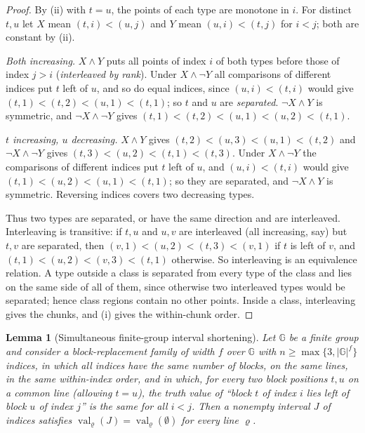 \documentclass[11pt]{article}
\numberwithin{equation}{section}
\theoremstyle{plain}
\newtheorem{lemma}[theorem]{Lemma}
\theoremstyle{definition}
\theoremstyle{remark}
\theoremstyle{plain}
\begin{document}
\begin{proof}
By (ii) with $t=u$, the points of each type are monotone in $i$.  For distinct
$t,u$ let $X$ mean $(t,i)<(u,j)$ and $Y$ mean $(u,i)<(t,j)$ for $i<j$; both are
constant by (ii).

\emph{Both increasing.}  $X\wedge Y$ puts all points of index $i$ of both types
before those of index $j>i$ (\emph{interleaved by rank}).  Under $X\wedge\neg Y$
all comparisons of different indices put $t$ left of $u$, and so do equal indices,
since $(u,i)<(t,i)$ would give $(t,1)<(t,2)<(u,1)<(t,1)$; so $t$ and $u$ are
\emph{separated}.  $\neg X\wedge Y$ is symmetric, and $\neg X\wedge\neg Y$ gives
$(t,1)<(t,2)<(u,1)<(u,2)<(t,1)$.

\emph{$t$ increasing, $u$ decreasing.}  $X\wedge Y$ gives
$(t,2)<(u,3)<(u,1)<(t,2)$ and $\neg X\wedge\neg Y$ gives
$(t,3)<(u,2)<(t,1)<(t,3)$.  Under $X\wedge\neg Y$ the comparisons of different
indices put $t$ left of $u$, and $(u,i)<(t,i)$ would give
$(t,1)<(u,2)<(u,1)<(t,1)$; so they are separated, and $\neg X\wedge Y$ is
symmetric.  Reversing indices covers two decreasing types.

Thus two types are separated, or have the same direction and are interleaved.
Interleaving is transitive: if $t,u$ and $u,v$ are interleaved (all increasing,
say) but $t,v$ are separated, then $(v,1)<(u,2)<(t,3)<(v,1)$ if $t$ is left of $v$,
and $(t,1)<(u,2)<(v,3)<(t,1)$ otherwise.  So interleaving is an equivalence
relation.  A type outside a class is separated from every type of the class and
lies on the same side of all of them, since otherwise two interleaved types would
be separated; hence class regions contain no other points.  Inside a class,
interleaving gives the chunks, and (i) gives the within-chunk order.
\end{proof}

\begin{lemma}[Simultaneous finite-group interval shortening]
\label{lem:group-interval}
Let ${\mathbb G}$ be a finite group and consider a block-replacement family of width $f$
over ${\mathbb G}$ with $n\ge\max\{3,|{\mathbb G}|^f\}$ indices, in which all indices have the same
number of blocks, on the same lines, in the same within-index order, and in which,
for every two block positions $t,u$ on a common line (allowing $t=u$), the truth value of
``block $t$ of index $i$ lies left of block $u$ of index $j$'' is the same for all
$i<j$.  Then a nonempty interval $J$ of indices satisfies
$\operatorname{val}_\varrho(J)=\operatorname{val}_\varrho(\emptyset)$ for every line $\varrho$.
\end{lemma}
\end{document}
